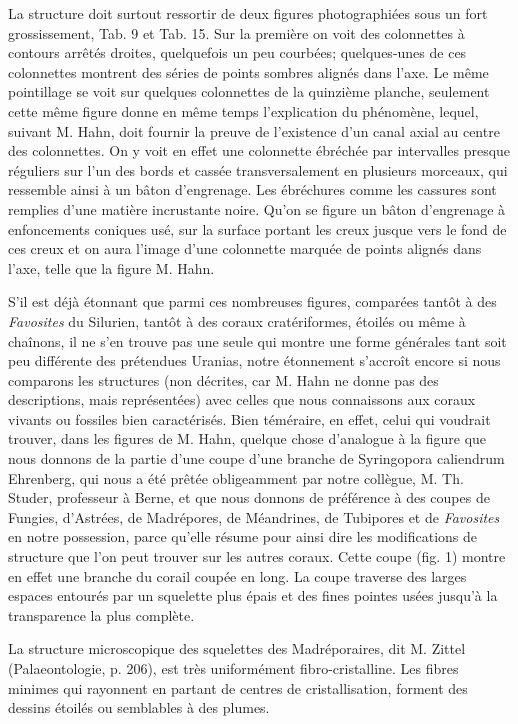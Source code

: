 \documentclass[a4paper, 12pt, oneside, french]{article}
\begin{document}
La structure doit surtout ressortir de deux figures photographiées sous un fort grossissement, Tab. 9 et Tab. 15. Sur la première on voit des colonnettes à contours arrêtés droites, quelquefois un peu courbées; quelques-unes de ces colonnettes montrent des séries de points sombres alignés dans l'axe. Le même pointillage se voit sur quelques colonnettes de la quinzième planche, seulement cette même figure donne en même temps l'explication du phénomène, lequel, suivant M. Hahn, doit fournir la preuve de l'existence d'un canal axial au centre des colonnettes. On y voit en effet une colonnette ébréchée par intervalles presque réguliers sur l'un des bords et cassée transversalement en plusieurs morceaux, qui ressemble ainsi à un bâton d'engrenage. Les ébréchures comme les cassures sont remplies d'une matière incrustante noire. Qu'on se figure un bâton d'engrenage à enfoncements coniques usé, sur la surface portant les creux jusque vers le fond de ces creux et on aura l'image d'une colonnette marquée de points alignés dans l'axe, telle que la figure M. Hahn.

S'il est déjà étonnant que parmi ces nombreuses figures, comparées tantôt à des \emph{Favosites} du Silurien, tantôt à des coraux cratériformes, étoilés ou même à chaînons, il ne s'en trouve pas une seule qui montre une forme générales tant soit peu différente des prétendues Uranias, notre étonnement s'accroît encore si nous comparons les structures (non décrites, car M. Hahn ne donne pas des descriptions, mais représentées) avec celles que nous connaissons aux coraux vivants ou fossiles bien caractérisés. Bien téméraire, en effet, celui qui voudrait trouver, dans les figures de M. Hahn, quelque chose d'analogue à la figure que nous donnons de la partie d'une coupe d'une branche de Syringopora caliendrum Ehrenberg, qui nous a été prêtée obligeamment par notre collègue, M. Th. Studer, professeur à Berne, et que nous donnons de préférence à des coupes de Fungies, d'Astrées, de Madrépores, de Méandrines, de Tubipores et de \emph{Favosites} en notre possession, parce qu'elle résume pour ainsi dire les modifications de structure que l'on peut trouver sur les autres coraux. Cette coupe (fig. 1) montre en effet une branche du corail coupée en long. La coupe traverse des larges espaces entourés par un squelette plus épais et des fines pointes usées jusqu'à la transparence la plus complète.

\og La structure microscopique des squelettes des Madréporaires, dit M. Zittel (Palaeontologie, p. 206), est très uniformément fibro-cristalline. Les fibres minimes qui rayonnent en partant de centres de cristallisation, forment des dessins étoilés ou semblables à des plumes. \fg
\end{document}

